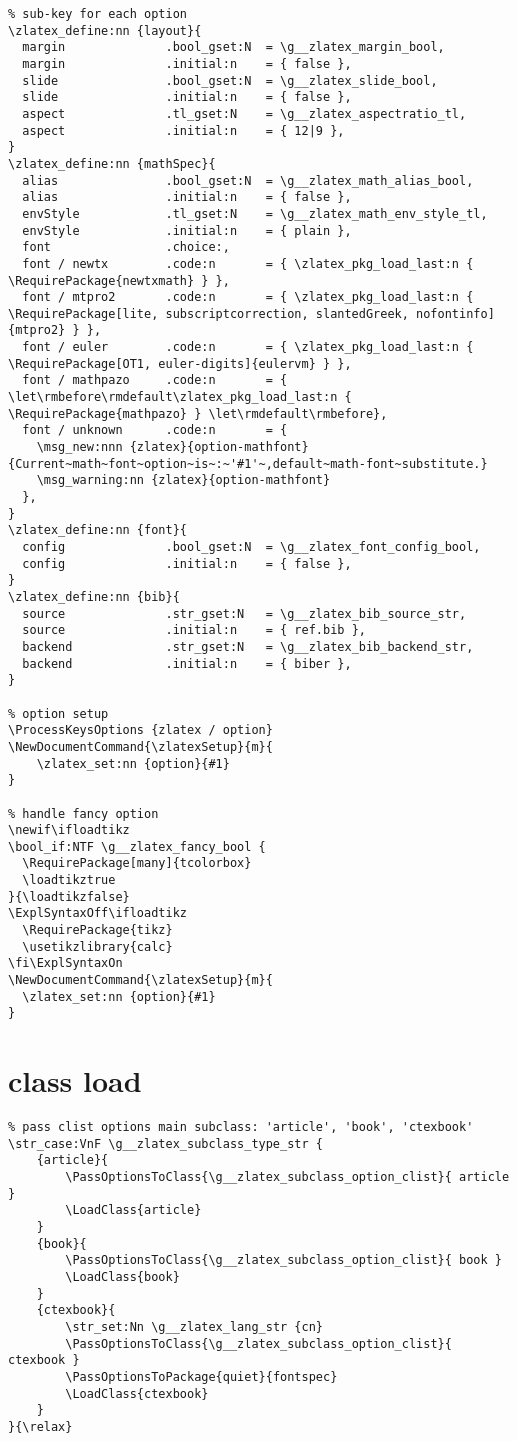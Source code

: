 \begin{verbatim}
% sub-key for each option
\zlatex_define:nn {layout}{
  margin              .bool_gset:N  = \g__zlatex_margin_bool,
  margin              .initial:n    = { false },
  slide               .bool_gset:N  = \g__zlatex_slide_bool,
  slide               .initial:n    = { false },
  aspect              .tl_gset:N    = \g__zlatex_aspectratio_tl,
  aspect              .initial:n    = { 12|9 },
}
\zlatex_define:nn {mathSpec}{
  alias               .bool_gset:N  = \g__zlatex_math_alias_bool,
  alias               .initial:n    = { false },
  envStyle            .tl_gset:N    = \g__zlatex_math_env_style_tl,
  envStyle            .initial:n    = { plain },
  font                .choice:,
  font / newtx        .code:n       = { \zlatex_pkg_load_last:n { \RequirePackage{newtxmath} } },
  font / mtpro2       .code:n       = { \zlatex_pkg_load_last:n { \RequirePackage[lite, subscriptcorrection, slantedGreek, nofontinfo]{mtpro2} } },
  font / euler        .code:n       = { \zlatex_pkg_load_last:n { \RequirePackage[OT1, euler-digits]{eulervm} } },
  font / mathpazo     .code:n       = { \let\rmbefore\rmdefault\zlatex_pkg_load_last:n { \RequirePackage{mathpazo} } \let\rmdefault\rmbefore},
  font / unknown      .code:n       = {
    \msg_new:nnn {zlatex}{option-mathfont}{Current~math~font~option~is~:~'#1'~,default~math-font~substitute.}
    \msg_warning:nn {zlatex}{option-mathfont}
  },
}
\zlatex_define:nn {font}{
  config              .bool_gset:N  = \g__zlatex_font_config_bool,
  config              .initial:n    = { false }, 
}
\zlatex_define:nn {bib}{
  source              .str_gset:N   = \g__zlatex_bib_source_str,
  source              .initial:n    = { ref.bib },
  backend             .str_gset:N   = \g__zlatex_bib_backend_str,
  backend             .initial:n    = { biber },
}

% option setup
\ProcessKeysOptions {zlatex / option}
\NewDocumentCommand{\zlatexSetup}{m}{
    \zlatex_set:nn {option}{#1}
}

% handle fancy option
\newif\ifloadtikz
\bool_if:NTF \g__zlatex_fancy_bool {
  \RequirePackage[many]{tcolorbox}
  \loadtikztrue
}{\loadtikzfalse}
\ExplSyntaxOff\ifloadtikz
  \RequirePackage{tikz}
  \usetikzlibrary{calc}
\fi\ExplSyntaxOn
\NewDocumentCommand{\zlatexSetup}{m}{
  \zlatex_set:nn {option}{#1}
}
\end{verbatim}

\section{class load}
\begin{verbatim}
% pass clist options main subclass: 'article', 'book', 'ctexbook'
\str_case:VnF \g__zlatex_subclass_type_str {
    {article}{
        \PassOptionsToClass{\g__zlatex_subclass_option_clist}{ article }
        \LoadClass{article}
    }
    {book}{
        \PassOptionsToClass{\g__zlatex_subclass_option_clist}{ book }
        \LoadClass{book}   
    }
    {ctexbook}{
        \str_set:Nn \g__zlatex_lang_str {cn}
        \PassOptionsToClass{\g__zlatex_subclass_option_clist}{ ctexbook }
        \PassOptionsToPackage{quiet}{fontspec}
        \LoadClass{ctexbook}    
    }
}{\relax}
\end{verbatim}

